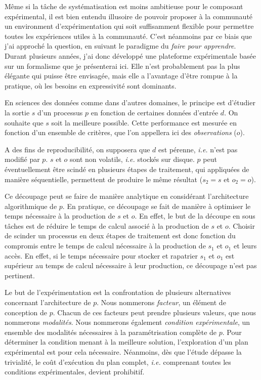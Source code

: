 Même si la tâche de systématisation est moins ambitieuse pour le composant expérimental, il est bien entendu illusoire de pouvoir proposer à la communauté un environment d'expérimentation qui soit suffisamment flexible pour permettre toutes les expériences utiles à la communauté. C'est néanmoins par ce biais que j'ai approché la question, en suivant le paradigme du \textsl{faire pour apprendre}. Durant plusieurs années, j'ai donc développé une plateforme expérimentale basée sur un formalisme que je présenterai ici. Elle n'est probablement pas la plus élégante qui puisse être envisagée, mais elle a l'avantage d'être rompue à la pratique, où les besoins en expressivité sont dominants.


En sciences des données comme dans d'autres domaines, le principe est d'étudier la sortie $s$ d'un processus $p$ en fonction de certaines données d'entrée $d$. On souhaite que $s$ soit la meilleure possible. Cette performance est mesurée en fonction d'un ensemble de critères, que l'on appellera ici des \textit{observations} ($o$).

A des fins de reproducibilité, on supposera que $d$ est pérenne, \textit{i.e.} n'est pas modifié par $p$. $s$ et $o$ sont non volatils, \textit{i.e.} stockés sur disque. $p$ peut éventuellement être scindé en plusieurs étapes de traitement, qui appliquées de manière séquentielle, permettent de produire le même résultat ($s_2=s$ et $o_2=o$). 

Ce découpage peut se faire de manière analytique en considérant l'architecture algorithmique de $p$. En pratique, ce découpage se fait de manière à optimiser le temps nécessaire à la production de $s$ et $o$. En effet, le but de la découpe en sous tâches est de réduire le temps de calcul associé à la production de $s$ et $o$. Choisir de scinder un processus en deux étapes de traitement est donc fonction du compromis entre le temps de calcul nécessaire à la production de $s_1$ et $o_1$ et leurs accès. En effet, si le temps nécessaire pour stocker et rapatrier $s_1$ et $o_1$ est supérieur au temps de calcul nécessaire à leur production, ce découpage n'est pas pertinent.

Le but de l'expérimentation est la confrontation de plusieurs alternatives concernant l'architecture de $p$. Nous nommerons \textit{facteur}, un élément de conception de $p$. Chacun de ces facteurs peut prendre plusieurs valeurs, que nous nommerons \textit{modalités}. Nous nommerons également \textit
{condition expérimentale}, un ensemble des modalités nécessaires à la  paramétrisation complète de $p$. Pour déterminer la condition menant à la meilleure solution, l'exploration d'un plan expérimental est pour cela nécessaire. Néanmoins, dès que l'étude dépasse la trivialité, le coût d'exécution du plan complet, \textit{i.e.} comprenant toutes les conditions expérimentales, devient prohibitif.

